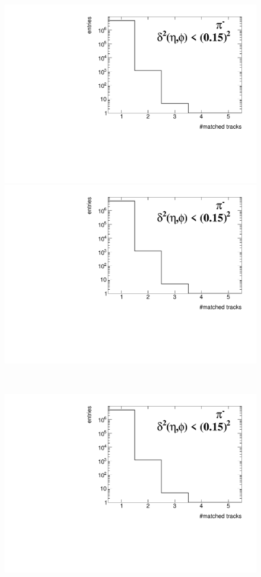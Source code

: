 \begin{figure}[ht]
	\centering
	\parbox{0.329\textwidth}{
		\centering
		\includegraphics[width=\linewidth,page=1]{graphics/eff/trackSplitting_QualityEtaPhiCD.pdf}\\
		\includegraphics[width=\linewidth,page=4]{graphics/eff/trackSplitting_QualityEtaPhiCD.pdf}\\
	}~
	\parbox{0.329\textwidth}{
		\centering
		\includegraphics[width=\linewidth,page=2]{graphics/eff/trackSplitting_QualityEtaPhiCD.pdf}\\
}
\end{figure}
